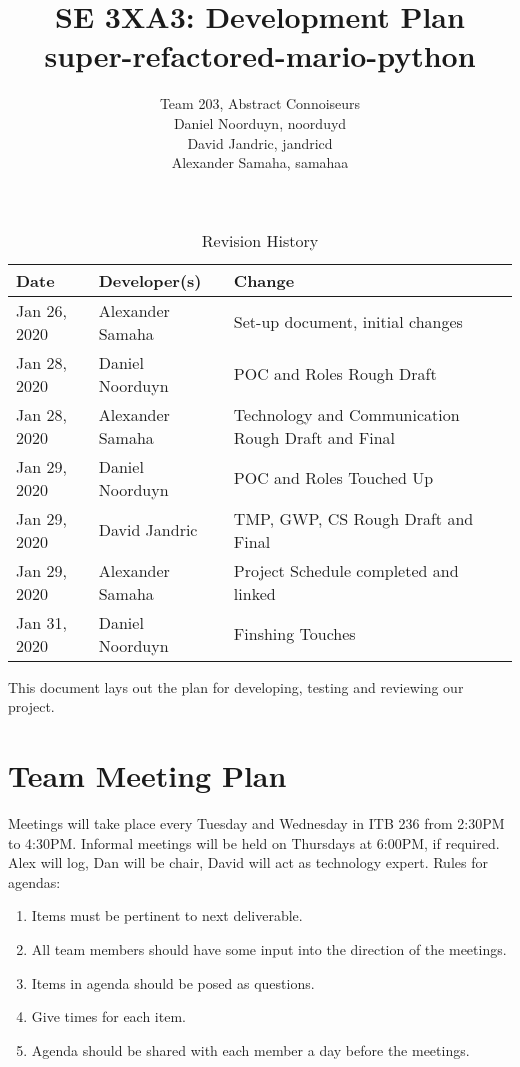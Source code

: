\documentclass{article}
\title{SE 3XA3: Development Plan\\super-refactored-mario-python}
\author{Team 203, Abstract Connoiseurs\\
Daniel Noorduyn, noorduyd\\
David Jandric, jandricd\\
Alexander Samaha, samahaa\\
}
\date{}
\begin{document}
\begin{table}[hp]
\caption{Revision History} \label{TblRevisionHistory}
\begin{tabularx}{\textwidth}{llX}
\toprule
\textbf{Date} & \textbf{Developer(s)} & \textbf{Change}\\
\midrule
Jan 26, 2020 & Alexander Samaha & Set-up document, initial changes\\
Jan 28, 2020 & Daniel Noorduyn & POC and Roles Rough Draft\\
Jan 28, 2020 & Alexander Samaha & Technology and Communication Rough Draft and Final\\
Jan 29, 2020 & Daniel Noorduyn & POC and Roles Touched Up\\
Jan 29, 2020 & David Jandric & TMP, GWP, CS Rough Draft and Final\\
Jan 29, 2020 & Alexander Samaha & Project Schedule completed and linked\\
Jan 31, 2020 & Daniel Noorduyn & Finshing Touches\\
\bottomrule
\end{tabularx}
\end{table}

\newpage

\maketitle

This document lays out the plan for developing, testing and reviewing our
project.

\section{Team Meeting Plan}

Meetings will take place every Tuesday and Wednesday in ITB 236 from 2:30PM to
4:30PM. Informal meetings will be held on Thursdays at 6:00PM, if required.
Alex will log, Dan will be chair, David will act as technology expert.
Rules for agendas:
\begin{enumerate}
    \item Items must be pertinent to next deliverable.
    \item All team members should have some input into the direction of the meetings.
    \item Items in agenda should be posed as questions.
    \item Give times for each item.
    \item Agenda should be shared with each member a day before the meetings.
\end{enumerate}
\end{document}
